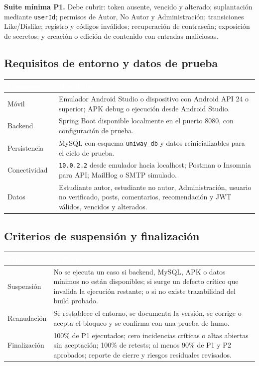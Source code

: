 \documentclass[11pt,a4paper]{article}
\newcommand{\thead}[1]{\textcolor{white}{\textbf{#1}}}
\begin{document}
\medskip
\noindent\textbf{Suite mínima P1.} Debe cubrir: token ausente, vencido y alterado; suplantación mediante \texttt{userId}; permisos de Autor, No Autor y Administración; transiciones Like/Dislike; registro y códigos inválidos; recuperación de contraseña; exposición de secretos; y creación o edición de contenido con entradas maliciosas.

\subsection{Requisitos de entorno y datos de prueba}
\begin{tabularx}{\textwidth}{p{2.4cm}Y}
\thead{Componente} & \thead{Requisito}\\
\midrule
Móvil & Emulador Android Studio o dispositivo con Android API 24 o superior; APK debug o ejecución desde Android Studio.\\
Backend & Spring Boot disponible localmente en el puerto 8080, con configuración de prueba.\\
Persistencia & MySQL con esquema \texttt{uniway\_db} y datos reinicializables para el ciclo de prueba.\\
Conectividad & \texttt{10.0.2.2} desde emulador hacia localhost; Postman o Insomnia para API; MailHog o SMTP simulado.\\
Datos & Estudiante autor, estudiante no autor, Administración, usuario no verificado, posts, comentarios, recomendación y JWT válidos, vencidos y alterados.\\
\end{tabularx}

\subsection{Criterios de suspensión y finalización}
\begin{tabularx}{\textwidth}{p{3.0cm}Y}
\thead{Tipo} & \thead{Criterio}\\
\midrule
Suspensión & No se ejecuta un caso si backend, MySQL, APK o datos mínimos no están disponibles; si surge un defecto crítico que invalida la ejecución restante; o si no existe trazabilidad del build probado.\\
Reanudación & Se restablece el entorno, se documenta la versión, se corrige o acepta el bloqueo y se confirma con una prueba de humo.\\
Finalización & 100\% de P1 ejecutados; cero incidencias críticas o altas abiertas sin aceptación; 100\% de retests; al menos 90\% de P1 y P2 aprobados; reporte de cierre y riesgos residuales revisados.\\
\end{tabularx}
\end{document}
